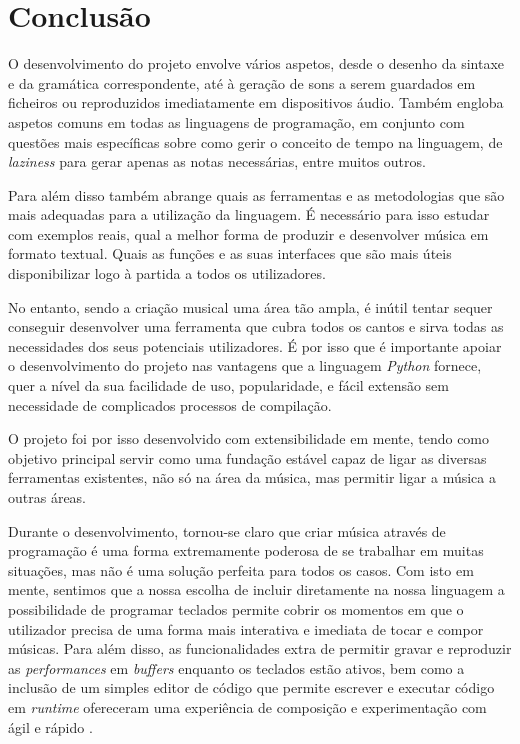 \chapter{Conclusão}
O desenvolvimento do projeto envolve vários aspetos, desde o desenho da sintaxe e da gramática correspondente, até à geração de sons a serem guardados em ficheiros ou reproduzidos imediatamente em dispositivos áudio. Também engloba aspetos comuns em todas as linguagens de programação, em conjunto com questões mais específicas sobre como gerir o conceito de tempo na linguagem, de \textit{laziness} para gerar apenas as notas necessárias, entre muitos outros.

Para além disso também abrange quais as ferramentas e as metodologias que são mais adequadas para a utilização da linguagem. É necessário para isso estudar com exemplos reais, qual a melhor forma de produzir e desenvolver música em formato textual. Quais as funções e as suas interfaces que são mais úteis disponibilizar logo à partida a todos os utilizadores.

No entanto, sendo a criação musical uma área tão ampla, é inútil tentar sequer conseguir desenvolver uma ferramenta que cubra todos os cantos e sirva todas as necessidades dos seus potenciais utilizadores. É por isso que é importante apoiar o desenvolvimento do projeto nas vantagens que a linguagem \textit{Python} fornece, quer a nível da sua facilidade de uso, popularidade, e fácil extensão sem necessidade de complicados processos de compilação.

O projeto foi por isso desenvolvido com extensibilidade em mente, tendo como objetivo principal servir como uma fundação estável capaz de ligar as diversas ferramentas existentes, não só na área da música, mas permitir ligar a música a outras áreas.

Durante o desenvolvimento, tornou-se claro que criar música através de programação é uma forma extremamente poderosa de se trabalhar em muitas situações, mas não é uma solução perfeita para todos os casos. Com isto em mente, sentimos que a nossa escolha de incluir diretamente na nossa linguagem a possibilidade de programar teclados permite cobrir os momentos em que o utilizador precisa de uma forma mais interativa e imediata de tocar e compor músicas. Para além disso, as funcionalidades extra de permitir gravar e reproduzir as \textit{performances} em \textit{buffers} enquanto os teclados estão ativos, bem como a inclusão de um simples editor de código que permite escrever e executar código em \textit{runtime} ofereceram uma experiência de composição e experimentação com ágil e rápido .

